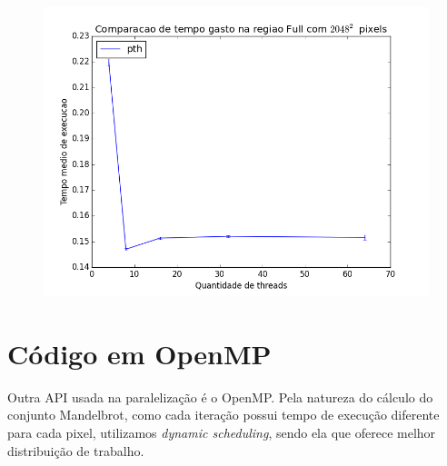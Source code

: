 \documentclass[12pt]{article}
\begin{document}
\begin{figure}[H]
    \centering
    \includegraphics[scale=.5]{time_x_thread_numpth.png}
\end{figure}



\newpage
\section{Código em OpenMP}
Outra API usada na paralelização é o OpenMP. Pela natureza do cálculo
do conjunto Mandelbrot, como cada iteração possui tempo de execução 
diferente para cada pixel, utilizamos \textit{dynamic scheduling}, 
sendo ela que oferece melhor distribuição de trabalho.
\end{document}
